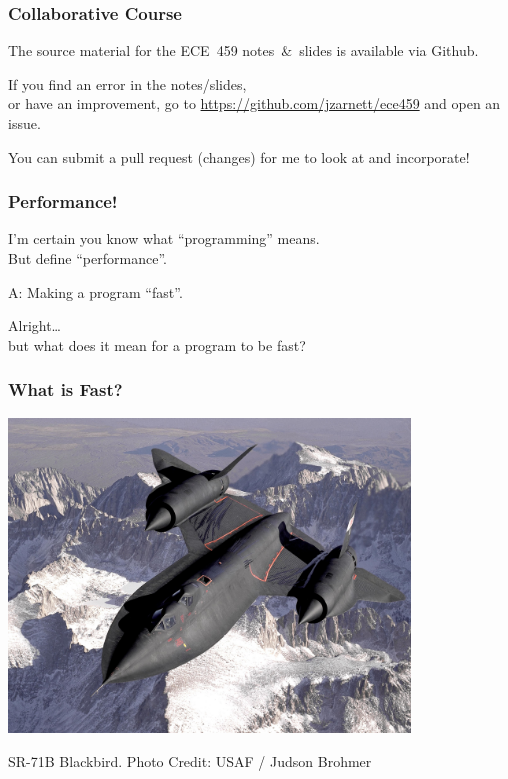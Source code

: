 \begin{frame}
\frametitle{Collaborative Course}
\Large

The source material for the ECE~459 notes~\&~slides is available via Github. 

If you find an error in the notes/slides, \\
or have an improvement, go to \url{https://github.com/jzarnett/ece459} and open an issue. 

You can submit a pull request (changes) for me to look at and incorporate!

\end{frame}



\begin{frame}
\frametitle{Performance!}
\large

I'm certain you know what ``programming'' means. \\
But define ``performance''. 

A: Making a program ``fast''. 

Alright\ldots\\ 
\qquad but what does it mean for a program to be fast?

\end{frame}

\begin{frame}
\frametitle{What is Fast?}

\begin{changemargin}{-1cm}
\begin{center}
\includegraphics[width=0.8\textwidth]{images/blackbird.jpg}
\end{center}
\hfill SR-71B Blackbird. Photo Credit: USAF / Judson Brohmer
\end{changemargin}
\end{frame}

